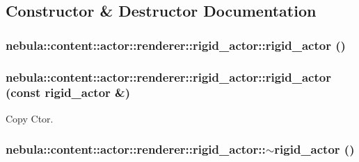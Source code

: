 \subsection{Constructor \& Destructor Documentation}
\hypertarget{classnebula_1_1content_1_1actor_1_1renderer_1_1rigid__actor_a060c37fc2052e41ed7ad8ec97b9e5d1b}{
\subsubsection[{rigid\_\-actor}]{\setlength{\rightskip}{0pt plus 5cm}nebula::content::actor::renderer::rigid\_\-actor::rigid\_\-actor ()}}
\label{classnebula_1_1content_1_1actor_1_1renderer_1_1rigid__actor_a060c37fc2052e41ed7ad8ec97b9e5d1b}
\hypertarget{classnebula_1_1content_1_1actor_1_1renderer_1_1rigid__actor_a56b6bbf4c56c70c06c164921e2e89c6c}{
\subsubsection[{rigid\_\-actor}]{\setlength{\rightskip}{0pt plus 5cm}nebula::content::actor::renderer::rigid\_\-actor::rigid\_\-actor (const {\bf rigid\_\-actor} \&)}}
\label{classnebula_1_1content_1_1actor_1_1renderer_1_1rigid__actor_a56b6bbf4c56c70c06c164921e2e89c6c}


Copy Ctor. \hypertarget{classnebula_1_1content_1_1actor_1_1renderer_1_1rigid__actor_a5cf3d70ac1a52f7f03093e56fc0f5dbc}{
\subsubsection[{$\sim$rigid\_\-actor}]{\setlength{\rightskip}{0pt plus 5cm}nebula::content::actor::renderer::rigid\_\-actor::$\sim$rigid\_\-actor ()}}
\label{classnebula_1_1content_1_1actor_1_1renderer_1_1rigid__actor_a5cf3d70ac1a52f7f03093e56fc0f5dbc}


